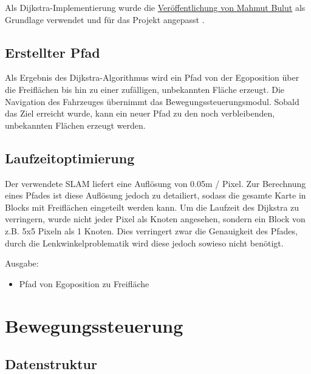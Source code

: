 Als Dijkstra-Implementierung wurde die \href{https://gist.github.com/vertexclique/7410577}{Veröffentlichung von Mahmut Bulut} als Grundlage verwendet und für das Projekt angepasst \cite{dijkstra.2018}.



\subsection{Erstellter Pfad}

Als Ergebnis des Dijkstra-Algorithmus wird ein Pfad von der Egoposition über die Freiflächen bis hin zu einer zufälligen, unbekannten Fläche erzeugt. Die Navigation des Fahrzeuges übernimmt das Bewegungssteuerungsmodul. Sobald das Ziel erreicht wurde, kann ein neuer Pfad zu den noch verbleibenden, unbekannten Flächen erzeugt werden.


\subsection{Laufzeitoptimierung}

Der verwendete SLAM liefert eine Auflösung von 0.05m / Pixel. Zur Berechnung eines Pfades ist diese Auflösung jedoch zu detailiert, sodass die gesamte Karte in Blocks mit Freiflächen eingeteilt werden kann. Um die Laufzeit des Dijkstra zu verringern, wurde nicht jeder Pixel als Knoten angesehen, sondern ein Block von z.B. 5x5 Pixeln als 1 Knoten. Dies verringert zwar die Genauigkeit des Pfades, durch die Lenkwinkelproblematik wird diese jedoch sowieso nicht benötigt.

Ausgabe:
\begin{itemize}
\item Pfad von Egoposition zu Freifläche
\end{itemize}










\section{Bewegungssteuerung}

\subsection{Datenstruktur}

